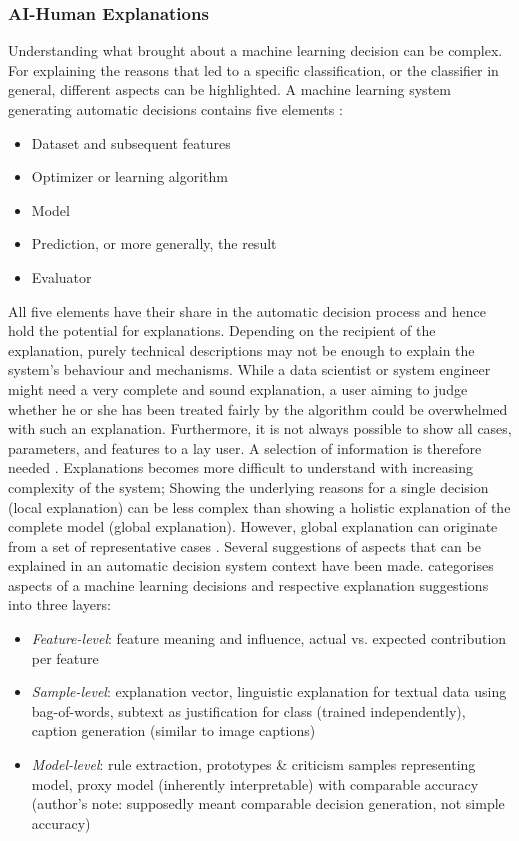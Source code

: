 \subsubsection{AI-Human Explanations}
\label{subsubsec:explanations_ai}
Understanding what brought about a machine learning decision can be complex. For explaining the reasons that led to a specific classification, or the classifier in general, different aspects can be highlighted.\newline
A machine learning system generating automatic decisions contains five elements \cite{ventocilla2018taxonomy}:
\begin{itemize}
	\item Dataset and subsequent features
	\item Optimizer or learning algorithm
	\item Model 
	\item Prediction, or more generally, the result
	\item Evaluator
\end{itemize}
All five elements have their share in the automatic decision process and hence hold the potential for explanations. Depending on the recipient of the explanation, purely technical descriptions may not be enough to explain the system's behaviour and mechanisms. While a data scientist or system engineer might need a very complete and sound explanation, a user aiming to judge whether he or she has been treated fairly by the algorithm could be overwhelmed with such an explanation. Furthermore, it is not always possible to show all cases, parameters, and features to a lay user. A selection of information is therefore needed \cite{ribeiro2016should}. Explanations becomes more difficult to understand with increasing complexity of the system; Showing the underlying reasons for a single decision (local explanation) can be less complex than showing a holistic explanation of the complete model (global explanation). However, global explanation can originate from a set of representative cases \cite{ribeiro2016should}.\newline
Several suggestions of aspects that can be explained in an automatic decision system context have been made. \cite{biran2017explanation} categorises aspects of a machine learning decisions and respective explanation suggestions into three layers:
\begin{itemize}
	\item \textit{Feature-level}: feature meaning and influence, actual vs. expected contribution per feature
	\item \textit{Sample-level}: explanation vector, linguistic explanation for textual data using bag-of-words, subtext as justification for class (trained independently), caption generation (similar to image captions) 
	\item \textit{Model-level}: rule extraction, prototypes \& criticism samples representing model, proxy model (inherently interpretable) with comparable accuracy (author's note: supposedly meant comparable decision generation, not simple accuracy)
\end{itemize}
